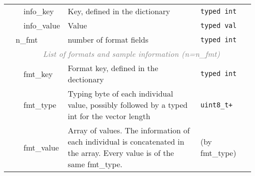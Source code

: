 \documentclass[10pt]{article}
\begin{document}
\begin{table}[h]
{\begin{tabular}{|l|l|l|p{8.0cm}|l|r|}
  & & {\sf info\_key} & Key, defined in the dictionary & {\tt typed int} & \\\cline{3-6}
  & & {\sf info\_value} & Value & {\tt typed val} &\\
  \cline{2-6}
  & \multicolumn{2}{l|}{\sf n\_fmt} & number of format fields & {\tt typed int} & \\\cline{2-6}
  & \multicolumn{5}{c|}{\textcolor{gray}{\it List of formats and sample information (n=n\_fmt)}} \\\cline{3-6}
  & & {\sf fmt\_key} & Format key, defined in the dectionary & {\tt typed int} & \\\cline{3-6}
  & & {\sf fmt\_type} & Typing byte of each individual value, possibly followed by a typed int for the vector length & {\tt uint8\_t+} & \\\cline{3-6}
  & & {\sf fmt\_value} & Array of values. The information of each individual is concatenated in the array. Every value is of the same {\sf fmt\_type}. & (by {\sf fmt\_type}) &\\
  \cline{1-6}
\end{tabular}}
\end{table}
\end{document}
